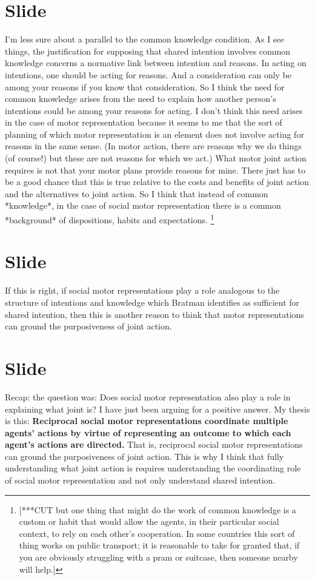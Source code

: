 \documentclass[12pt,\papersize]{extarticle}
\begin{document}
\section{Slide}
I’m less sure about a parallel to the common knowledge condition.
As I see things, the justification for supposing that shared intention involves common knowledge concerns a normative link between intention and reasons.
In acting on intentions, one should be acting for reasons.
And a consideration can only be among your reasons if you know that consideration.
So I think the need for common knowledge arises from the need to explain how another person’s intentions could be among your reasons for acting.
I don’t think this need arises in the case of motor representation because it seems to me that the sort of planning of which motor representation is an element does not involve acting for reasons in the same sense.  
(In motor action, there are reasons why we do things (of course!) but these are not  reasons for which we act.)
What motor joint action requires is not that your motor plans provide reasons for mine.
There just has to be a good chance that this is true relative to the costs and benefits of joint action and the alternatives to joint action.
So I think that instead of common *knowledge*, in the case of social motor representation there is a common *background* of dispositions, habits and expectations.%
\footnote{
[***CUT but one thing that might do the work of common knowledge is a custom or habit 
that would allow the agents, in their particular social context, to rely on each other’s cooperation.
In some countries this sort of thing works on public transport; 
it is reasonable to take for granted that, if you are obviously struggling with a pram or suitcase, then someone nearby will help.]
}



\section{Slide}
If this is right, if social motor representations play a role analogous to the structure of intentions and knowledge which Bratman identifies as sufficient for shared intention, then this is another reason to think that motor representations can ground the purposiveness of joint action.



\section{Slide}
Recap: the question was: Does social motor representation also play a role in explaining what joint is?
I have just been arguing for a positive answer.
My thesis is this:
\textbf{
Reciprocal social motor representations coordinate multiple agents’ actions by virtue of representing an outcome to which each agent’s actions are directed.
}
That is, reciprocal social motor representations can ground the purposiveness of joint action.
This is why I think that fully understanding what joint action is requires understanding the coordinating role of social motor representation and not only understand shared intention.
\end{document}
